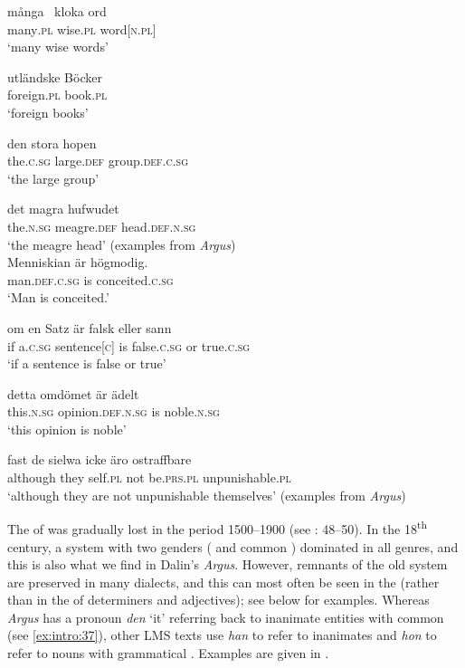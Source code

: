 \documentclass[output=paper]{langscibook}
\begin{document}
\ex\label{ex:intro:35c}
\gll  många~  kloka    ord\\
    many\textsc{.pl}  wise\textsc{.pl}  word[\textsc{n.pl]}\\
    \glt ‘many wise words’

\ex\label{ex:intro:35d}
\gll  utländske   Böcker\\
    foreign.\textsc{pl}  book.\textsc{pl}\\
    \glt  ‘foreign books’

\ex\label{ex:intro:35e}
\gll  den     stora       hopen\\
    the.\textsc{c.sg} large.\textsc{def}   group.\textsc{def.c.sg}\\
\glt    ‘the large group’

\ex\label{ex:intro:35f}
\gll  det       magra       hufwudet\\
    the\textsc{.n.sg} meagre\textsc{.def}    head\textsc{.def.n.sg}\\
\glt    ‘the meagre head’
    (examples from \textit{Argus})\\
\z
\ex \label{ex:intro:36}
\ea \label{ex:intro:36a}
\gll  Menniskian       är högmodig. \\
man.\textsc{def.c.sg}   is   conceited.\textsc{c.sg}\\
\glt ‘Man is conceited.’

\ex \label{ex:intro:36b}
\gll  om   en       Satz       är   falsk       eller   sann\\
    if     a.\textsc{c.sg}     sentence[\textsc{c}] is   false.\textsc{c.sg}   or     true\textsc{.c.sg}\\
\glt `if a sentence is false or true’

\ex \label{ex:intro:36c}
\gll  detta       omdömet         är ädelt\\
    this.\textsc{n.sg}   opinion\textsc{.def.n.sg}    is noble\textsc{.n.sg}\\
\glt `this opinion is noble’

\ex \label{ex:intro:36d}
\gll  fast       de   sielwa   icke   äro       ostraffbare\\
    although   they   self.\textsc{pl}   not   be\textsc{.prs.pl}  unpunishable.\textsc{pl}\\
\glt `although they are not unpunishable themselves’ (examples from \textit{Argus})
\z
\z

The  of  was gradually lost in the period 1500–1900 (see \citealt{Davidson1990}: 48–50). In the 18\textsuperscript{th} century, a system with two genders ( and common ) dominated in all genres, and this is also what we find in Dalin’s \textit{Argus}. However, remnants of the old system are preserved in many dialects, and this can most often be seen in the  (rather than in the  of determiners and adjectives); see  below for examples. Whereas \textit{Argus} has a pronoun \textit{den} ‘it’ referring back to inanimate entities with common  (see \ref{ex:intro:37}), other LMS texts use \textit{han} to refer to  inanimates and \textit{hon} to refer to nouns with grammatical  . Examples are given in .
\end{document}

